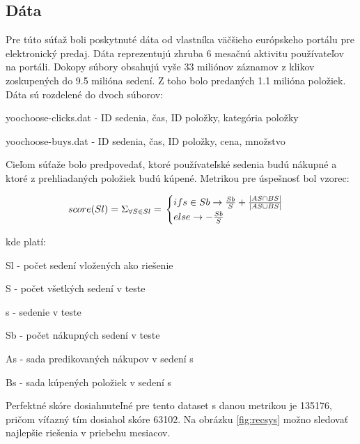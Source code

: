 \subsection{Dáta}
Pre túto súťaž boli poskytnuté dáta od vlastníka väčšieho európskeho portálu pre elektronický predaj. Dáta reprezentujú zhruba 6 mesačnú aktivitu používateľov na portáli. Dokopy súbory obsahujú vyše 33 miliónov záznamov z klikov zoskupených do 9.5 milióna sedení. Z toho bolo predaných 1.1 milióna položiek. Dáta sú rozdelené do dvoch súborov:

\begin{my_itemize}
	\item{yoochoose-clicks.dat}\newline
	- ID sedenia, čas, ID položky, kategória položky
	\newline
	\item{yoochoose-buys.dat}\newline
	- ID sedenia, čas, ID položky, cena, množstvo
	
\end{my_itemize}

Cieľom súťaže bolo predpovedať, ktoré používateľské sedenia budú nákupné a ktoré z prehliadaných položiek budú kúpené. Metrikou pre úspešnosť bol vzorec:


\label{recsys_evaluation}
$$
score(Sl)=\Sigma_{\forall S \in Sl} =\\
\begin{cases}
	if s \in Sb \to \frac{Sb}{S} + \frac{|AS\cap BS|}{|AS\cup BS|} \\
	else \to -\frac{Sb}{S}\\
\end{cases}
$$

kde platí:

\begin{my_itemize}
	\item{Sl} - počet sedení vložených ako riešenie
	\item{S} - počet všetkých sedení v teste
	\item{s} - sedenie v teste
	\item{Sb} - počet nákupných sedení v teste
	\item{As} - sada predikovaných nákupov v sedení s
	\item{Bs} - sada kúpených položiek v sedení s
\end{my_itemize}

Perfektné skóre dosiahnuteľné pre tento dataset s danou metrikou je 135176, pričom víťazný tím dosiahol skóre 63102. Na obrázku \ref{fig:recsys} možno sledovať najlepšie riešenia v priebehu mesiacov.


